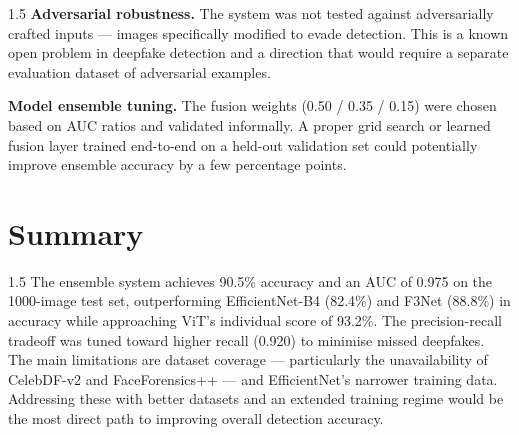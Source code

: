 \begin{spacing}{1.5}
\noindent\textbf{Adversarial robustness.}\quad
The system was not tested against adversarially crafted inputs --- images specifically modified to evade detection. This is a known open problem in deepfake detection and a direction that would require a separate evaluation dataset of adversarial examples.

\noindent\textbf{Model ensemble tuning.}\quad
The fusion weights (0.50 / 0.35 / 0.15) were chosen based on AUC ratios and validated informally. A proper grid search or learned fusion layer trained end-to-end on a held-out validation set could potentially improve ensemble accuracy by a few percentage points.
\end{spacing}

\section{Summary}

\begin{spacing}{1.5}
The ensemble system achieves 90.5\% accuracy and an AUC of 0.975 on the 1000-image test set, outperforming EfficientNet-B4 (82.4\%) and F3Net (88.8\%) in accuracy while approaching ViT's individual score of 93.2\%. The precision-recall tradeoff was tuned toward higher recall (0.920) to minimise missed deepfakes. The main limitations are dataset coverage --- particularly the unavailability of CelebDF-v2 and FaceForensics++ --- and EfficientNet's narrower training data. Addressing these with better datasets and an extended training regime would be the most direct path to improving overall detection accuracy.
\end{spacing}
